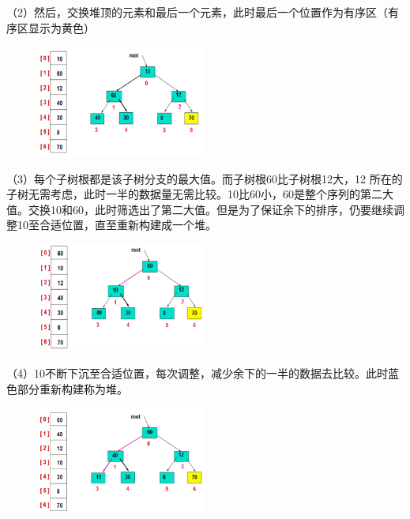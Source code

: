 （2）然后，交换堆顶的元素和最后一个元素，此时最后一个位置作为有序区（有序区显示为黄色）
\begin{figure}[h]
\begin{center}
\includegraphics[width=0.5\textwidth]{pictures/heapsort1.png}
\end{center}
\end{figure}

（3）每个子树根都是该子树分支的最大值。而子树根60比子树根12大，12 所在的子树无需考虑，此时一半的数据量无需比较。10比60小，60是整个序列的第二大值。交换10和60，此时筛选出了第二大值。但是为了保证余下的排序，仍要继续调整10至合适位置，直至重新构建成一个堆。
\begin{figure}[h]
\begin{center}
\includegraphics[width=0.5\textwidth]{pictures/heapsort2.png}
\end{center}
\end{figure}

\newpage
（4）10不断下沉至合适位置，每次调整，减少余下的一半的数据去比较。此时蓝色部分重新构建称为堆。
\begin{figure}[h]
\begin{center}
\includegraphics[width=0.5\textwidth]{pictures/heapsort3.png}
\end{center}
\end{figure}

